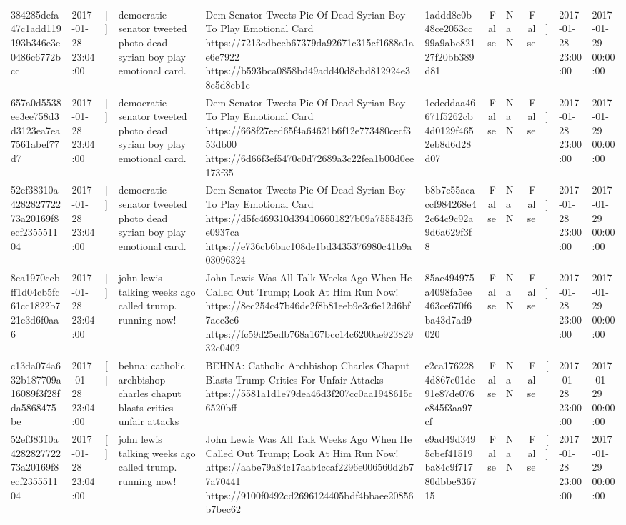 \begin{tabular}{llllllrlrlll}
384285defa47c1add119193b346e3e0486c6772bcc & 2017-01-28 23:04:00 & [] & democratic senator tweeted photo dead syrian boy play emotional card. & Dem Senator Tweets Pic Of Dead Syrian Boy To Play Emotional Card https://7213cdbceb67379da92671c315cf1688a1ae6e7922 https://b593bca0858bd49add40d8cbd812924e38c5d8cb1c & 1addd8e0b48ce2053cc99a9abe82127f20bb389d81 & False & NaN & False & [] & 2017-01-28 23:00:00 & 2017-01-29 00:00:00 \\
657a0d5538ee3ee758d3d3123ea7ea7561abef77d7 & 2017-01-28 23:04:00 & [] & democratic senator tweeted photo dead syrian boy play emotional card. & Dem Senator Tweets Pic Of Dead Syrian Boy To Play Emotional Card https://668f27eed65f4a64621b6f12e773480cecf353db00 https://6d66f3ef5470c0d72689a3c22fea1b00d0ee173f35 & 1ededdaa46671f5262cb4d0129f4652eb8d6d28d07 & False & NaN & False & [] & 2017-01-28 23:00:00 & 2017-01-29 00:00:00 \\
52ef38310a428282772273a20169f8ecf235551104 & 2017-01-28 23:04:00 & [] & democratic senator tweeted photo dead syrian boy play emotional card. & Dem Senator Tweets Pic Of Dead Syrian Boy To Play Emotional Card https://d5fc469310d394106601827b09a755543f5e0937ca https://e736cb6bac108de1bd3435376980c41b9a03096324 & b8b7c55acaccf984268e42c64c9c92a9d6a629f3f8 & False & NaN & False & [] & 2017-01-28 23:00:00 & 2017-01-29 00:00:00 \\
8ca1970ccbff1d04cb5fc61cc1822b721c3d6f0aa6 & 2017-01-28 23:04:00 & [] & john lewis talking weeks ago called trump. running now! & John Lewis Was All Talk Weeks Ago When He Called Out Trump; Look At Him Run Now! https://8ec254c47b46de2f8b81eeb9e3c6e12d6bf7aec3e6 https://fc59d25edb768a167bcc14c6200ae92382932c0402 & 85ae494975a4098fa5ee463ce670f6ba43d7ad9020 & False & NaN & False & [] & 2017-01-28 23:00:00 & 2017-01-29 00:00:00 \\
c13da074a632b187709a16089f3f28fda5868475be & 2017-01-28 23:04:00 & [] & behna: catholic archbishop charles chaput blasts critics unfair attacks & BEHNA: Catholic Archbishop Charles Chaput Blasts Trump Critics For Unfair Attacks https://5581a1d1e79dea46d3f207cc0aa1948615c6520bff & e2ca1762284d867e01de91e87de076c845f3aa97cf & False & NaN & False & [] & 2017-01-28 23:00:00 & 2017-01-29 00:00:00 \\
52ef38310a428282772273a20169f8ecf235551104 & 2017-01-28 23:04:00 & [] & john lewis talking weeks ago called trump. running now! & John Lewis Was All Talk Weeks Ago When He Called Out Trump; Look At Him Run Now! https://aabe79a84c17aab4ccaf2296e006560d2b77a70441 https://9100f0492cd2696124405bdf4bbaee20856b7bec62 & e9ad49d3495cbef41519ba84c9f71780dbbe836715 & False & NaN & False & [] & 2017-01-28 23:00:00 & 2017-01-29 00:00:00 \\

\end{tabular}
